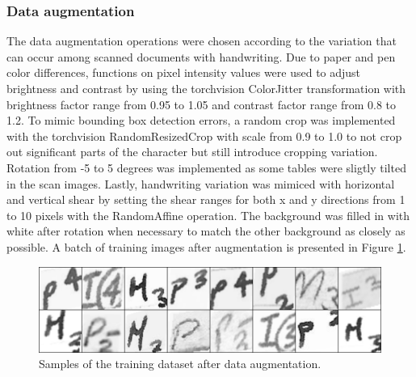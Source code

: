 \documentclass{article}
\begin{document}
\subsubsection{Data augmentation}
\label{sect:aug}

The data augmentation operations were chosen according to the variation that can 
occur among scanned documents with handwriting.
Due to paper and pen color differences, functions on pixel intensity
values were used to adjust brightness and contrast by using the 
torchvision ColorJitter transformation with brightness factor range from 
0.95 to 1.05 and contrast factor range from 0.8 to 1.2. To mimic bounding box detection errors, 
a random crop was implemented with the torchvision RandomResizedCrop with 
scale from 0.9 to 1.0 to not crop out significant parts of the character but 
still introduce cropping variation. Rotation from -5 to 5 degrees 
was implemented as some tables were sligtly tilted in the scan images. 
Lastly, handwriting variation was mimiced with horizontal and vertical 
shear by setting the shear ranges for both x and y directions from 1 
to 10 pixels with the RandomAffine operation. The background was filled in 
with white after rotation when necessary to match the other background as closely as possible.
 A batch of training images after augmentation
is presented in Figure \ref{image:augmented}.

\begin{figure}[h]
    \centering
    \includegraphics*[scale=.2]{../images/augmented.png}
    \caption{Samples of the training dataset after data augmentation.}
    \label{image:augmented}
\end{figure}
\end{document}
